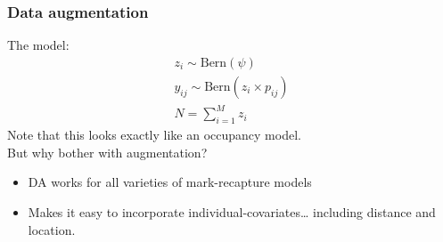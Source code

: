 \documentclass[color=usenames,dvipsnames]{beamer}\usepackage[]{graphicx}\usepackage[]{xcolor}
\begin{document}
\begin{frame}
  \frametitle{Data augmentation}
  The model:
  \begin{gather*}
    z_i \sim \mathrm{Bern}(\psi) \\
    y_{ij} \sim \mathrm{Bern}(z_i \times p_{ij}) \\
    N=\sum_{i=1}^M z_i
  \end{gather*}
  \pause \vfill
  Note that this looks exactly like an occupancy model. \\
  \pause \vfill
  But why bother with augmentation?
  \begin{itemize}
    \item DA works for \alert{all} varieties of mark-recapture models
    \item Makes it easy to incorporate individual-covariates\dots \pause
      including distance and location.
  \end{itemize}
\end{frame}




\end{document}
